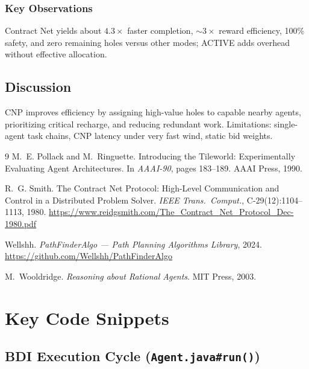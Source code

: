 \subsubsection{Key Observations}

Contract Net yields about $4.3\times$ faster completion, $\sim 3\times$ reward efficiency, 100\% safety, and zero remaining holes versus other modes; ACTIVE adds overhead without effective allocation.

\subsection{Discussion}

CNP improves efficiency by assigning high-value holes to capable nearby agents, prioritizing critical recharge, and reducing redundant work. Limitations: single-agent task chains, CNP latency under very fast wind, static bid weights.

\begin{thebibliography}{9}
M.~E. Pollack and M.~Ringuette.
\newblock Introducing the Tileworld: Experimentally Evaluating Agent Architectures.
\newblock In \emph{AAAI-90}, pages 183--189. AAAI Press, 1990.

R.~G. Smith.
\newblock The Contract Net Protocol: High-Level Communication and Control in a Distributed Problem Solver.
\newblock \emph{IEEE Trans.\ Comput.}, C-29(12):1104--1113, 1980.
\newblock \url{https://www.reidgsmith.com/The_Contract_Net_Protocol_Dec-1980.pdf}

Wellshh.
\newblock \emph{PathFinderAlgo --- Path Planning Algorithms Library}, 2024.
\newblock \url{https://github.com/Wellshh/PathFinderAlgo}

M.~Wooldridge.
\newblock \emph{Reasoning about Rational Agents}.
\newblock MIT Press, 2003.
\end{thebibliography}

\appendix
\section{Key Code Snippets}

\subsection{BDI Execution Cycle (\texttt{Agent.java\#run()})}

